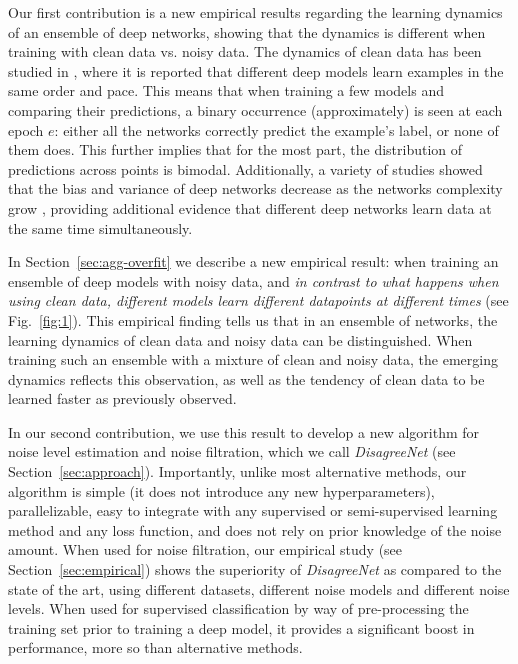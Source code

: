 \documentclass{article}
\begin{document}
Our first contribution is a new empirical results regarding the learning dynamics of an ensemble of deep networks, showing that the dynamics is different when training with clean data vs. noisy data. The dynamics of clean data has been studied in \citep{hacohen2020let,pliushch2021deep}, where it is reported that different deep models learn examples in the same order and pace. This means that when training a few models and comparing their predictions, a binary occurrence (approximately) is seen at each epoch $e$: either all the networks correctly predict the example's label, or none of them does. This further implies that for the most part, the distribution of predictions across points is bimodal. Additionally, a variety of studies showed that the bias and variance of deep networks decrease as the networks complexity grow \citep{nakkiran2021deep,neal2018modern}, providing additional evidence that different deep networks learn data at the same time simultaneously. 

In Section~\ref{sec:agg-overfit} we describe a new empirical result: when training an ensemble of deep models with noisy data, and \emph{in contrast to what happens when using clean data, different models learn different datapoints at different times} (see Fig.~\ref{fig:1}). This empirical finding tells us that in an ensemble of networks, the learning dynamics of clean data and noisy data can be distinguished. When training such an ensemble with a mixture of clean and noisy data, the emerging dynamics reflects this observation, as well as the tendency of clean data to be learned faster as previously observed. 

In our second contribution, we use this result to develop a new algorithm for noise level estimation and noise filtration, which we call \emph{DisagreeNet} (see Section~\ref{sec:approach}). Importantly, unlike most alternative methods, our algorithm is simple (it does not introduce any new hyperparameters), parallelizable, easy to integrate with any supervised or semi-supervised learning method and any loss function, and does not rely on prior knowledge of the noise amount. When used for noise filtration, our empirical study (see Section~\ref{sec:empirical}) shows the superiority of \emph{DisagreeNet} as compared to the state of the art, using different datasets, different noise models and different noise levels. When used for supervised classification by way of pre-processing the training set prior to training a deep model, it provides a significant boost in performance, more so than alternative methods. 
\end{document}
